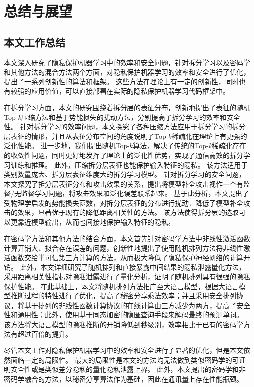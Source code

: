 \chapter{总结与展望}
\section{本文工作总结}
本文深入研究了隐私保护机器学习中的效率和安全问题，针对拆分学习以及密码学和其他方法的混合方法两个方面，对隐私保护机器学习的效率和安全进行了优化，提出了一系列创新性的算法和框架。
%
这些方法在理论上有一定的创新性，同时也有较强的应用价值，可以直接部署在实际的隐私保护机器学习代码框架中。
%

在拆分学习方面，本文的研究围绕着拆分层的表征分布，创新地提出了表征的随机Top-$k$压缩方法和基于势能损失的扰动方法，分别提高了拆分学习的效率和安全性。
%
针对拆分学习的效率问题，本文探究了各种压缩方法应用于拆分学习的拆分层表征的情形，并且从表征分布空间的角度说明了Top-$k$稀疏化在理论上有更强的泛化性能。
进一步地，我们提出随机Top-$k$算法，解决了传统的Top-$k$稀疏化存在的收敛性问题，同时更好地发挥了理论上的泛化性优势，实现了通信高效的拆分学习训练和推理。
此外，压缩拆分层表征也能保护输入特征的隐私。
%
该方法适用于类别数量庞大、拆分层表征维度大的拆分学习模型。
%
针对拆分学习的安全问题，本文探究了拆分层表征分布和攻击效果的关系，提出将模型补全攻击视作一个有监督/无监督学习问题，将攻击效果和泛化误差联系起来。
基于此分析，本文提出了受物理学启发的势能损失函数，对拆分层表征的分布进行扰动，降低了模型补全攻击的效果，显著优于现有的降低距离相关性的方法。
该方法使得拆分层的选取可以更靠近模型输出，从而也间接地保护输入特征的隐私。

在密码学方法和其他方法的结合方面，本文首先针对密码学方法中非线性激活函数计算开销大、拟合存在误差的问题，创新性地提出了使用随机排列方法将非线性激活函数交给半可信第三方计算的方法，从而极大降低了隐私保护神经网络的计算开销。
此外，本文详细研究了随机排列和直接暴露中间结果的隐私泄露量化方法，采用距离相关性指标对隐私泄露进行了量化分析，证明了随机排列具有很强的隐私保护性能。
在此基础上，本文将随机排列方法推广至大语言模型，根据大语言模型推断过程的特性进行了优化，提高了秘密分享乘法效率；并且采用安全排列协议，将基于排列的非线性函数计算协议的在线计算由三方减少为两方，提高了安全性和通用性；此外，使用基于同态加密的隐匿查询手段来解码最终的预测单词。
%
该方法将大语言模型的隐私推断的开销降低到秒级别，效率相比于已有的密码学方法有超过百倍的提升。


尽管本文工作对隐私保护机器学习中的效率和安全进行了显著的优化，但是本文依然面临一定的局限性。
%
最大的局限性是本文的方法均无法做到类似密码学的可证明安全性或是类似差分隐私的量化隐私泄露上界。
%
此外，本文提出的密码学和非密码学融合的方法，以秘密分享算法作为基础，因此在通讯量上存在性能瓶颈。

